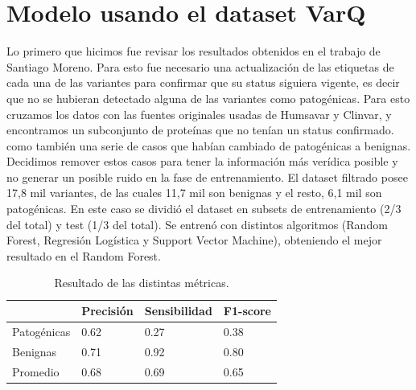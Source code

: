 \section{Modelo usando el dataset VarQ}

Lo primero que hicimos fue revisar los resultados obtenidos en el trabajo de Santiago Moreno. Para esto fue necesario una actualización de las etiquetas de cada una de las variantes para confirmar que su status siguiera vigente, es decir que no se hubieran detectado alguna de las variantes como patogénicas. Para esto cruzamos los datos con las fuentes originales usadas de Humsavar y Clinvar, y encontramos un subconjunto de proteínas que no tenían un status confirmado. como también una serie de casos que habían cambiado de patogénicas a benignas. Decidimos remover estos casos para tener la información más verídica posible y no generar un posible ruido en la fase de entrenamiento.
El dataset filtrado posee 17,8 mil variantes, de las cuales 11,7 mil son benignas y el resto, 6,1 mil son patogénicas. En este caso se dividió el dataset en subsets de entrenamiento (2/3 del total) y test (1/3 del total). Se entrenó con distintos algoritmos (Random Forest, Regresión Logística y Support Vector Machine), obteniendo el mejor resultado en el Random Forest. 
\begin{table}[H]
\centering
\begin{tabular}{|l|l|l|l|}
\hline
              & Precisión & Sensibilidad & F1-score \\ \hline
Patogénicas   & 0.62      & 0.27   & 0.38     \\ \hline
Benignas      & 0.71      & 0.92   & 0.80     \\ \hline
Promedio      & 0.68      & 0.69   & 0.65     \\ \hline   
\end{tabular}
\caption{Resultado de las distintas métricas.}
\label{fig:metrics_varq}
\end{table}

